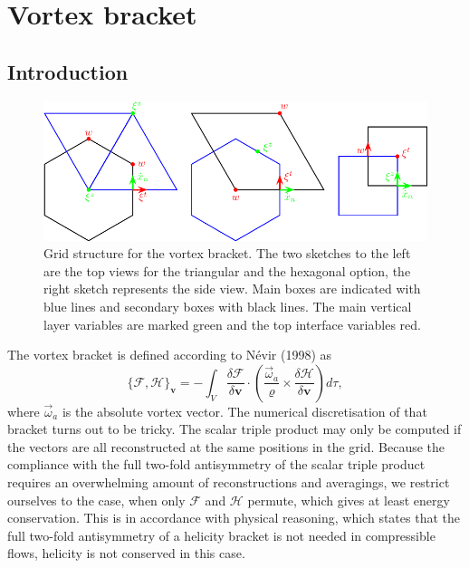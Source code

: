 \chapter{Vortex bracket}
\section{Introduction}

\begin{figure}[h]
%
\begin{center}
\includegraphics{fig_vortex_boxes.pdf}
\end{center}
\caption{Grid structure for the vortex bracket. The two sketches to the left 
are the top views for the triangular and the hexagonal option, the right sketch
represents the side view. Main boxes are indicated with blue lines and secondary
boxes with black lines. The main vertical layer variables are marked green and 
the top interface variables red.}
\label{heli_grid}
\end{figure}

The vortex bracket is defined according to N\'evir (1998) as
\begin{equation}
\{\mathcal{F},\mathcal{H}\}_{\mathbf{v}}=
-\int_V\frac{\delta\mathcal{F}}{\delta\mathbf{v}}\cdot
\left(\frac{\vec{\omega}_a}{\varrho}\times
\frac{\delta\mathcal{H}}{\delta\mathbf{v}}\right)d\tau,
\label{vortex_bra}
\end{equation}
where $\vec{\omega}_a$ is the absolute vortex vector. The numerical 
discretisation of that bracket turns out to be tricky. The scalar triple 
product may only be computed if the vectors are all reconstructed at the same 
positions in the grid. Because the compliance with the full two-fold 
antisymmetry of the scalar triple product requires an overwhelming amount of 
reconstructions and averagings, we restrict ourselves to the case, when only 
$\mathcal{F}$ and $\mathcal{H}$ permute, which gives at least energy 
conservation. This is in accordance with physical reasoning, which states that 
the full two-fold antisymmetry of a helicity bracket is not needed in 
compressible flows, helicity is not conserved in this case.

